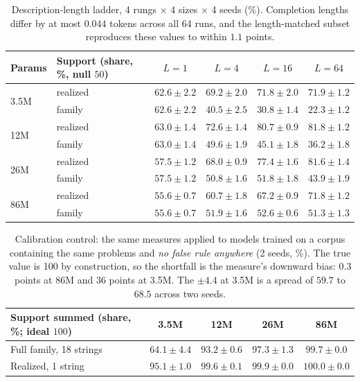 \documentclass{article}
\begin{document}
\begin{table}[ht]
\centering
\small
\begin{tabular}{llcccc}
\toprule
Params & Support (share, \%, null $50$) & $L{=}1$ & $L{=}4$ & $L{=}16$ & $L{=}64$ \\
\midrule
\multirow{2}{*}{3.5M} & realized & $62.6 \pm 2.2$ & $69.2 \pm 2.0$ & $71.8 \pm 2.0$ & $71.9 \pm 1.2$ \\
 & family & $62.6 \pm 2.2$ & $40.5 \pm 2.5$ & $30.8 \pm 1.4$ & $22.3 \pm 1.2$ \\
\midrule
\multirow{2}{*}{12M} & realized & $63.0 \pm 1.4$ & $72.6 \pm 1.4$ & $80.7 \pm 0.9$ & $81.8 \pm 1.2$ \\
 & family & $63.0 \pm 1.4$ & $49.6 \pm 1.9$ & $45.1 \pm 1.8$ & $36.2 \pm 1.8$ \\
\midrule
\multirow{2}{*}{26M} & realized & $57.5 \pm 1.2$ & $68.0 \pm 0.9$ & $77.4 \pm 1.6$ & $81.6 \pm 1.4$ \\
 & family & $57.5 \pm 1.2$ & $50.8 \pm 1.6$ & $51.8 \pm 1.8$ & $43.9 \pm 1.9$ \\
\midrule
\multirow{2}{*}{86M} & realized & $55.6 \pm 0.7$ & $60.7 \pm 1.8$ & $67.2 \pm 0.9$ & $71.8 \pm 1.2$ \\
 & family & $55.6 \pm 0.7$ & $51.9 \pm 1.6$ & $52.6 \pm 0.6$ & $51.3 \pm 1.3$ \\
\bottomrule
\end{tabular}
\caption{Description-length ladder, 4 rungs $\times$ 4 sizes $\times$ 4 seeds (\%). Completion lengths differ by at most $0.044$ tokens across all 64 runs, and the length-matched subset reproduces these values to within $1.1$ points.}
\label{tab:ladder_full}
\end{table}

\begin{table}[ht]
\centering
\small
\begin{tabular}{lcccc}
\toprule
Support summed (share, \%; ideal $100$) & 3.5M & 12M & 26M & 86M \\
\midrule
Full family, 18 strings & $64.1 \pm 4.4$ & $93.2 \pm 0.6$ & $97.3 \pm 1.3$ & $99.7 \pm 0.0$ \\
Realized, 1 string & $95.1 \pm 1.0$ & $99.6 \pm 0.1$ & $99.9 \pm 0.0$ & $100.0 \pm 0.0$ \\
\bottomrule
\end{tabular}
\caption{Calibration control: the same measures applied to models trained on a corpus containing the same problems and \emph{no false rule anywhere} (2 seeds, \%). The true value is 100 by construction, so the shortfall is the measure's downward bias: $0.3$ points at 86M and $36$ points at 3.5M. The $\pm 4.4$ at 3.5M is a spread of $59.7$ to $68.5$ across two seeds.}
\label{tab:clean_control}
\end{table}
\end{document}
